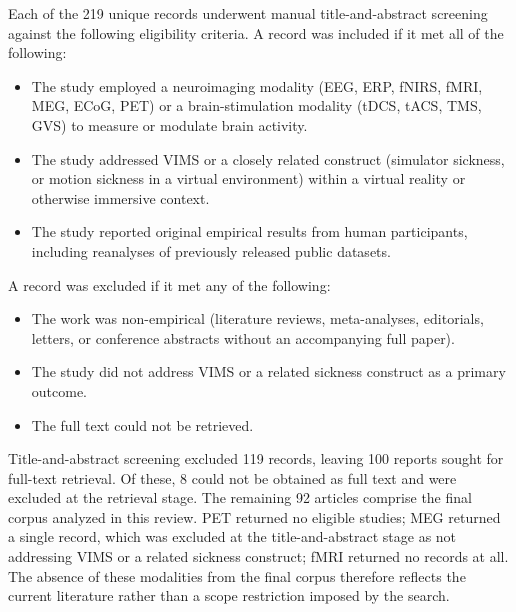 Each of the 219 unique records underwent manual title-and-abstract screening against the following eligibility criteria.
A record was included if it met all of the following:
\begin{itemize}
    \item The study employed a neuroimaging modality (EEG, ERP, fNIRS, fMRI, MEG, ECoG, PET) or a brain-stimulation modality (tDCS, tACS, TMS, GVS) to measure or modulate brain activity.
    \item The study addressed VIMS or a closely related construct (simulator sickness, or motion sickness in a virtual environment) within a virtual reality or otherwise immersive context.
    \item The study reported original empirical results from human participants, including reanalyses of previously released public datasets.
\end{itemize}

A record was excluded if it met any of the following:
\begin{itemize}
    \item The work was non-empirical (literature reviews, meta-analyses, editorials, letters, or conference abstracts without an accompanying full paper).
    \item The study did not address VIMS or a related sickness construct as a primary outcome.
    \item The full text could not be retrieved.
\end{itemize}

Title-and-abstract screening excluded 119 records, leaving 100 reports sought for full-text retrieval.
Of these, 8 could not be obtained as full text and were excluded at the retrieval stage.
The remaining 92 articles comprise the final corpus analyzed in this review.
PET returned no eligible studies; MEG returned a single record, which was excluded at the title-and-abstract stage as not addressing VIMS or a related sickness construct; fMRI returned no records at all.
The absence of these modalities from the final corpus therefore reflects the current literature rather than a scope restriction imposed by the search.

